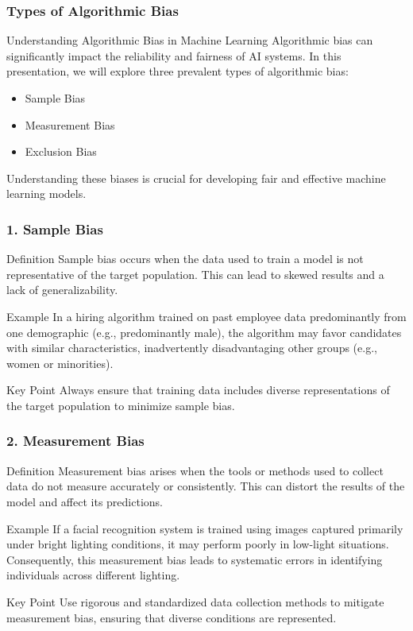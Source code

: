 \documentclass[aspectratio=169]{beamer}
\begin{document}
\begin{frame}[fragile]
    \frametitle{Types of Algorithmic Bias}
    \begin{block}{Understanding Algorithmic Bias in Machine Learning}
        Algorithmic bias can significantly impact the reliability and fairness of AI systems. 
        In this presentation, we will explore three prevalent types of algorithmic bias: 
        \begin{itemize}
            \item Sample Bias
            \item Measurement Bias
            \item Exclusion Bias
        \end{itemize}
        Understanding these biases is crucial for developing fair and effective machine learning models.
    \end{block}
\end{frame}

\begin{frame}[fragile]
    \frametitle{1. Sample Bias}
    \begin{block}{Definition}
        Sample bias occurs when the data used to train a model is not representative of the target population. 
        This can lead to skewed results and a lack of generalizability.
    \end{block}
    \begin{block}{Example}
        In a hiring algorithm trained on past employee data predominantly from one demographic (e.g., predominantly male), the algorithm may favor candidates with similar characteristics, inadvertently disadvantaging other groups (e.g., women or minorities).
    \end{block}
    \begin{block}{Key Point}
        Always ensure that training data includes diverse representations of the target population to minimize sample bias.
    \end{block}
\end{frame}

\begin{frame}[fragile]
    \frametitle{2. Measurement Bias}
    \begin{block}{Definition}
        Measurement bias arises when the tools or methods used to collect data do not measure accurately or consistently.
        This can distort the results of the model and affect its predictions.
    \end{block}
    \begin{block}{Example}
        If a facial recognition system is trained using images captured primarily under bright lighting conditions, it may perform poorly in low-light situations. Consequently, this measurement bias leads to systematic errors in identifying individuals across different lighting.
    \end{block}
    \begin{block}{Key Point}
        Use rigorous and standardized data collection methods to mitigate measurement bias, ensuring that diverse conditions are represented.
    \end{block}
\end{frame}
\end{document}
